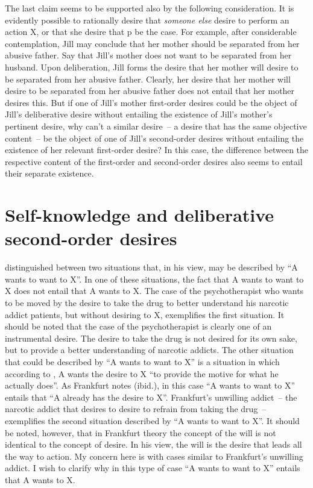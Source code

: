 \documentclass[output=paper]{langscibook}
\begin{document}
The last claim seems to be supported also by the following consideration. It is evidently possible to rationally desire that \textit{someone else} desire to perform an action X, or that she desire that p be the case. For example, after considerable contemplation, Jill may conclude that her mother should be separated from her abusive father. Say that Jill's mother does not want to be separated from her husband. Upon deliberation, Jill forms the desire that her mother will desire to be separated from her abusive father. Clearly, her desire that her mother will desire to be separated from her abusive father does not entail that her mother desires this. But if one of Jill’s mother first-order desires could be the object of Jill’s deliberative desire without entailing the existence of Jill’s mother’s pertinent desire, why can't a similar desire~– a desire that has the same objective content~– be the object of one of Jill's second-order desires without entailing the existence of her relevant first-order desire? In this case, the difference between the respective content of the first-order and second-order desires also seems to entail their separate existence. 

\section{Self-knowledge and deliberative second-order desires}

\citet{frankfurt1988importance} distinguished between two situations that, in his view, may be described by “A wants to want to X”. In one of these situations, the fact that A wants to want to X does not entail that A wants to X. The case of the psychotherapist who wants to be moved by the desire to take the drug to better understand his narcotic addict patients, but without desiring to X, exemplifies the first situation. It should be noted that the case of the psychotherapist is clearly one of an instrumental desire. The desire to take the drug is not desired for its own sake, but to provide a better understanding of narcotic addicts. The other situation that could be described by “A wants to want to X” is a situation in which according to \citet[15]{frankfurt1988importance}, A wants the desire to X “to provide the motive for what he actually does”. As Frankfurt notes (ibid.), in this case “A wants to want to X” entails that “A already has the desire to X”. Frankfurt's unwilling addict~– the narcotic addict that desires to desire to refrain from taking the drug~– exemplifies the second situation described by “A wants to want to X”. 
It should be noted, however, that in Frankfurt theory the concept of the will is not identical to the concept of desire. In his view, the will is the desire that leads all the way to action. My concern here is with cases similar to Frankfurt's unwilling addict.  I wish to clarify why in this type of case “A wants to want to X” entails that A wants to X.     
\end{document}
